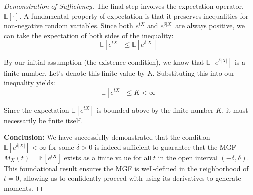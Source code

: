 \documentclass[12pt, letterpaper]{article}
\newcommand{\E}{\mathbb{E}} %
\begin{document}
\begin{proof}[Demonstration of Sufficiency]
The final step involves the expectation operator, $\E[\cdot]$. A fundamental property of expectation is that it preserves inequalities for non-negative random variables. Since both $e^{tX}$ and $e^{\delta|X|}$ are always positive, we can take the expectation of both sides of the inequality:
\[ \E[e^{tX}] \le \E[e^{\delta|X|}] \]

By our initial assumption (the existence condition), we know that $\E[e^{\delta|X|}]$ is a finite number. Let's denote this finite value by $K$. Substituting this into our inequality yields:
\[ \E[e^{tX}] \le K < \infty \]

Since the expectation $\E[e^{tX}]$ is bounded above by the finite number $K$, it must necessarily be finite itself.

\textbf{Conclusion:} We have successfully demonstrated that the condition $\E[e^{\delta|X|}] < \infty$ for some $\delta > 0$ is indeed sufficient to guarantee that the MGF $M_X(t) = \E[e^{tX}]$ exists as a finite value for all $t$ in the open interval $(-\delta, \delta)$. This foundational result ensures the MGF is well-defined in the neighborhood of $t=0$, allowing us to confidently proceed with using its derivatives to generate moments.
\end{proof}

\end{document}
